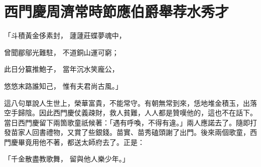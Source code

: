 %

\chapter{西門慶周濟常時節\KG 應伯爵舉荐水秀才}

「斗積黃金侈素封，  蘧蘧莊蝶夢魂中，

曾聞郿鄔光難駐，  不道銅山運可窮；

此日分籯推鮑子，  當年沉水笑龐公，

悠悠末路誰知己，  惟有夫君尚古風。」

這八句單說人生世上，榮華富貴，不能常守。有朝無常到來，恁地堆金積玉，出落空手歸陰。因此西門慶仗義疎財，救人貧難，人人都是贊嘆他的，這也不在話下。當日西門慶留下兩箇歌童祇候著：「遇有呼喚，不得有違。」兩人應諾去了。隨即打發苗家人回書禮物，又賞了些銀錢。苗實、苗秀磕頭謝了出門。後來兩個歌童，西門慶畢竟用他不著，都送太師府去了。正是：

「千金散盡教歌舞，  留與他人樂少年。」

